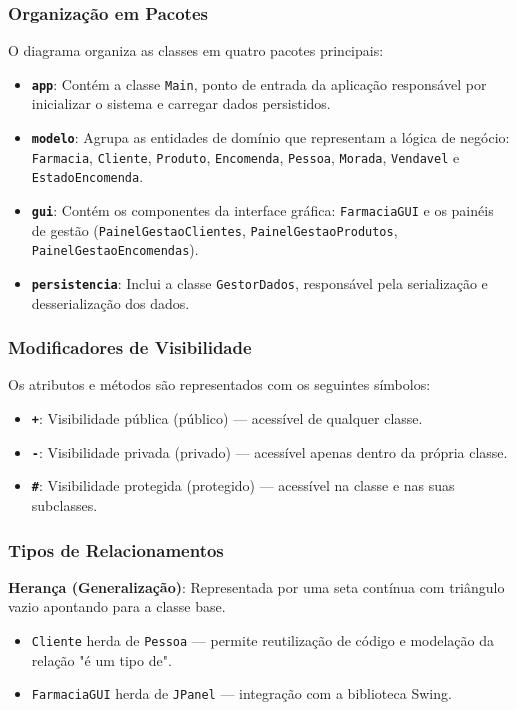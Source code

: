 \documentclass[a4paper,12pt]{article}
\begin{document}
\subsubsection{Organização em Pacotes}
O diagrama organiza as classes em quatro pacotes principais:
\begin{itemize}
    \item \textbf{\texttt{app}}: Contém a classe \texttt{Main}, ponto de entrada da aplicação responsável por inicializar o sistema e carregar dados persistidos.
    \item \textbf{\texttt{modelo}}: Agrupa as entidades de domínio que representam a lógica de negócio: \texttt{Farmacia}, \texttt{Cliente}, \texttt{Produto}, \texttt{Encomenda}, \texttt{Pessoa}, \texttt{Morada}, \texttt{Vendavel} e \texttt{EstadoEncomenda}.
    \item \textbf{\texttt{gui}}: Contém os componentes da interface gráfica: \texttt{FarmaciaGUI} e os painéis de gestão (\texttt{PainelGestaoClientes}, \texttt{PainelGestaoProdutos}, \texttt{PainelGestaoEncomendas}).
    \item \textbf{\texttt{persistencia}}: Inclui a classe \texttt{GestorDados}, responsável pela serialização e desserialização dos dados.
\end{itemize}

\subsubsection{Modificadores de Visibilidade}
Os atributos e métodos são representados com os seguintes símbolos:
\begin{itemize}
    \item \textbf{\texttt{+}}: Visibilidade pública (público) — acessível de qualquer classe.
    \item \textbf{\texttt{-}}: Visibilidade privada (privado) — acessível apenas dentro da própria classe.
    \item \textbf{\texttt{\#}}: Visibilidade protegida (protegido) — acessível na classe e nas suas subclasses.
\end{itemize}

\subsubsection{Tipos de Relacionamentos}

\textbf{Herança (Generalização)}: Representada por uma seta contínua com triângulo vazio apontando para a classe base.
\begin{itemize}
    \item \texttt{Cliente} herda de \texttt{Pessoa} — permite reutilização de código e modelação da relação "é um tipo de".
    \item \texttt{FarmaciaGUI} herda de \texttt{JPanel} — integração com a biblioteca Swing.
\end{itemize}
\end{document}
